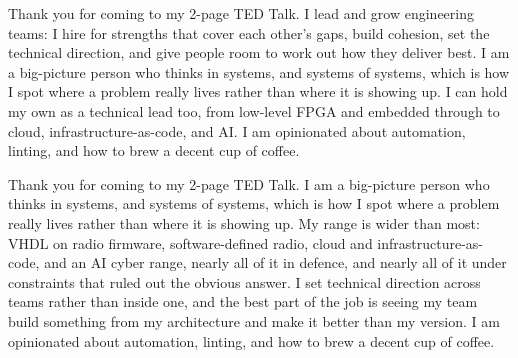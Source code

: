 

%
%


%
%


\ifseniormgr%
Thank you for coming to my 2-page TED Talk.
I lead and grow engineering teams: I hire for strengths that cover each other's gaps, build cohesion, set the technical direction, and give people room to work out how they deliver best.
I am a big-picture person who thinks in systems, and systems of systems, which is how I spot where a problem really lives rather than where it is showing up.
I can hold my own as a technical lead too, from low-level FPGA and embedded through to cloud, infrastructure-as-code, and AI.
I am opinionated about automation, linting, and how to brew a decent cup of coffee.

\else\iftechnical%
Thank you for coming to my 2-page TED Talk.
I am a big-picture person who thinks in systems, and systems of systems, which is how I spot where a problem really lives rather than where it is showing up.
My range is wider than most: VHDL on radio firmware, software-defined radio, cloud and infrastructure-as-code, and an AI cyber range, nearly all of it in defence, and nearly all of it under constraints that ruled out the obvious answer.
I set technical direction across teams rather than inside one, and the best part of the job is seeing my team build something from my architecture and make it better than my version.
I am opinionated about automation, linting, and how to brew a decent cup of coffee.

